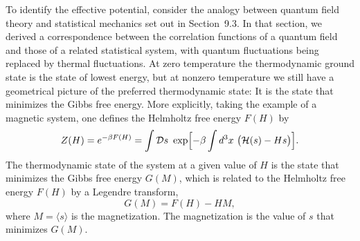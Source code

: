 To identify the effective potential, consider the analogy between quantum
field theory and statistical mechanics set out in Section~9.3.  In that
section, we derived a correspondence between the correlation functions of a
quantum field and those of a related statistical system, with quantum
fluctuations being replaced by thermal fluctuations.  At zero temperature the
thermodynamic ground state is the state of lowest energy, but at nonzero
temperature we still have a geometrical picture of the preferred
thermodynamic state: It is the state that minimizes the Gibbs free energy.
More explicitly, taking the example of a magnetic system, one defines the
Helmholtz free energy $F(H)$ by
\begin{equation}
  Z(H) = e^{-\beta F(H)} = \int \mathcal{D}s\ \exp\Bigl[ -\beta
    \int d^3x\ \bigl( \mathcal{H}(s) - H s \bigr) \Bigr] .
  \label{eq:11.40}
\end{equation}
The thermodynamic state of the system at a given value of $H$ is the state
that minimizes the Gibbs free energy $G(M)$, which is related to the Helmholtz
free energy $F(H)$ by a Legendre transform,
\begin{equation}
  G(M) = F(H) - HM ,
\end{equation}
where $M = \langle s\rangle$ is the magnetization.  The magnetization is the
value of $s$ that minimizes $G(M)$.

